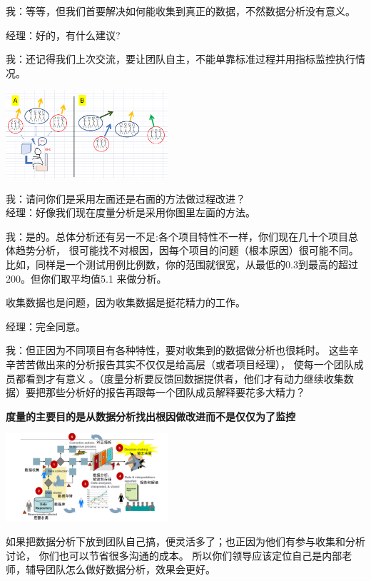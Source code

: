 我：等等，但我们首要解决如何能收集到真正的数据，不然数据分析没有意义。

经理：好的，有什么建议?

我：还记得我们上次交流，要让团队自主，不能单靠标准过程并用指标监控执行情况。


\includegraphics[width=6cm]{Diagram_20.png}

我：请问你们是采用左面还是右面的方法做过程改进？\\
经理：好像我们现在度量分析是采用你图里左面的方法。

我：是的。总体分析还有另一不足:各个项目特性不一样，你们现在几十个项目总体趋势分析，
很可能找不对根因，因每个项目的问题（根本原因）很可能不同。
比如，同样是一个测试用例比例数，你的范围就很宽，从最低的0.3到最高的超过200。但你们取平均值5.1
来做分析。

收集数据也是问题，因为收集数据是挺花精力的工作。

经理：完全同意。

我：但正因为不同项目有各种特性，要对收集到的数据做分析也很耗时。
这些辛辛苦苦做出来的分析报告其实不仅仅是给高层（或者项目经理），
使每一个团队成员都看到才有意义
。（度量分析要反馈回数据提供者，他们才有动力继续收集数据）要把那些分析好的报告再跟每一个团队成员解释要花多大精力？

\textbf{度量的主要目的是从数据分析找出根因做改进而不是仅仅为了监控}


\includegraphics[width=6cm]{Ma4CarScreenshot_2021-12-27_205004.png}

如果把数据分析下放到团队自己搞，便灵活多了；也正因为他们有参与收集和分析讨论，
你们也可以节省很多沟通的成本。
所以你们领导应该定位自己是内部老师，辅导团队怎么做好数据分析，效果会更好。

